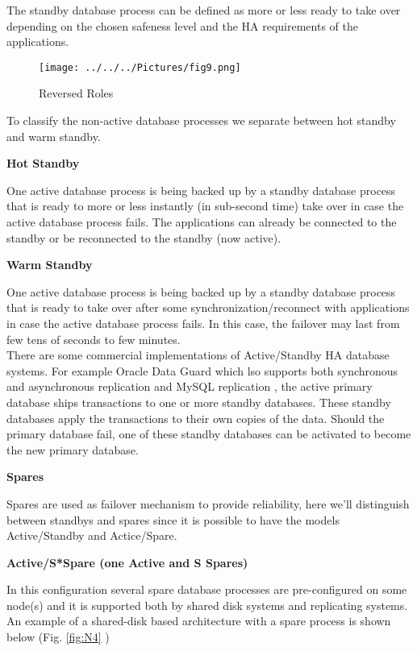 \documentclass[english]{tktltiki2}
\theoremstyle{definition}
\theoremstyle{remark}
\begin{document}
 
\pagebreak
The standby database process can be defined as more or less ready to take over depending on the chosen safeness level and the HA requirements of the applications. 


\begin{figure}[h!]
\texttt{[image: ../../../Pictures/fig9.png]} 
\caption{Reversed Roles \cite{inproceedings}}
\label{fig:N3}
\end{figure}
To classify the non-active database processes we separate between hot standby and warm standby.\\

\begin{flushleft}
\textbf{Hot Standby}
\end{flushleft}
One active database process is being backed up by a standby database process that is ready to more or less instantly (in sub-second time) take over in case the active database process fails. The applications can already be connected to the standby or be reconnected to the standby (now active).

\begin{flushleft}
\textbf{Warm Standby}
\end{flushleft}
One active database process is being backed up by a standby database process that is ready to take over after some synchronization/reconnect with applications in case the active database process fails. In this case, the failover may last from few tens of seconds to few minutes.\\

There are some commercial implementations of Active/Standby HA database systems. For example Oracle Data Guard \cite{Oracle} which lso supports both synchronous and asynchronous replication and MySQL replication \cite{MySQL2}, the active primary database ships transactions to one or more standby databases. These standby databases apply the transactions to their own copies of the data. Should the primary database fail, one of these standby databases can be activated to become the new primary database.

\begin{flushleft}
\textbf{Spares}
\end{flushleft}
Spares are used as failover mechanism to provide reliability, here we'll distinguish between standbys and spares since it is possible to have the models Active/Standby and Actice/Spare.

\begin{flushleft}
\textbf{Active/S*Spare (one Active and S Spares)}
\end{flushleft}
In this configuration several spare database processes are pre-configured on some node(s) and it is supported both by shared disk systems and replicating systems. An example of a shared-disk based architecture with a spare process is shown below (Fig. \ref{fig:N4} )
\end{document}
